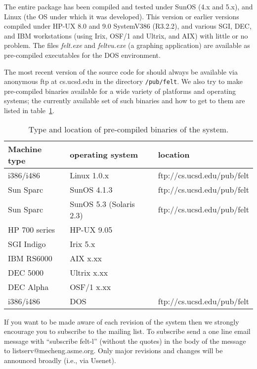 \begin{appendix}
The entire package has been compiled and tested under SunOS (4.x and 5.x), 
and Linux (the OS under which it was developed).  This version or earlier 
versions
compiled under HP-UX 8.0 and 9.0 SystemV386 (R3.2.2), and various SGI, DEC, 
and IBM workstations (using Irix, OSF/1 and Ultrix, and AIX) with little or
no problem.  
The files {\em felt.exe} and {\em feltvu.exe} (a graphing application) 
are available as pre-compiled executables for the DOS environment.  	

The most recent version of the source code for \felt{} should always be 
available via anonymous
ftp at cs.ucsd.edu in the directory {\tt /pub/felt}.  We also try to make 
pre-compiled binaries available for a wide variety of platforms and operating
systems; the currently available set of such binaries and how to get to
them are listed in table~\ref{binary_table}.  
\begin{table}
 \begin{center}
 \begin{tabular}{|l|l|l|}
 \hline
Machine type	& operating system	& location \\
 \hline\hline
i386/i486	& Linux 1.0.x		& ftp://cs.ucsd.edu/pub/felt \\
Sun Sparc	& SunOS 4.1.3		& ftp://cs.ucsd.edu/pub/felt \\
Sun Sparc	& SunOS 5.3 (Solaris 2.3) & ftp://cs.ucsd.edu/pub/felt \\
HP 700 series   & HP-UX 9.05		& \\
SGI Indigo	& Irix 5.x		& \\
IBM RS6000	& AIX x.xx		& \\
DEC 5000	& Ultrix x.xx		& \\
DEC Alpha	& OSF/1 x.xx		& \\
i386/i486	& DOS			& ftp://cs.ucsd.edu/pub/felt \\
 \hline
 \end{tabular}
\end{center}
\caption{Type and location of pre-compiled binaries of the \felt{} system.}
\label{binary_table}
\end{table}

If you want to be
made aware of each revision of the \felt{} system then we strongly encourage
you to subscribe to the \felt{} mailing list.  To subscribe send a one line
email message with ``subscribe felt-l'' (without the quotes) in the body
of the message to listserv@mecheng.asme.org.
Only major revisions and changes will be announced broadly (i.e., via Usenet).


\end{appendix}
